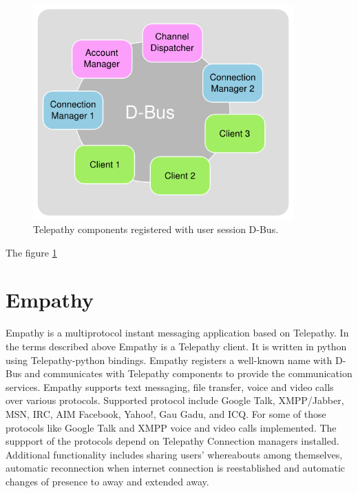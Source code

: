 \begin{figure}[ht]
	\begin{center}
	\includegraphics[width=10cm]{fig/telepathy-components-dbus.png}
	\caption{Telepathy components registered with user session D-Bus.\cite{TPWiki}}
	\label{fig:telepathyComponentsDbus}
\end{center}
\end{figure}

The figure \ref{fig:telepathyComponentsDbus}


\section{Empathy}
Empathy is a multiprotocol instant messaging application based on Telepathy. In the terms described above Empathy is a Telepathy client. It is written in python using Telepathy-python bindings. Empathy registers a well-known name with D-Bus and communicates with Telepathy components to provide the communication services. Empathy supports text messaging, file transfer, voice and video calls over various protocols. Supported protocol include Google Talk, XMPP/Jabber, MSN, IRC, AIM Facebook, Yahoo!, Gau Gadu, and ICQ. For some of those protocols like Google Talk and XMPP voice and video calls implemented. The suppport of the protocols depend on Telepathy Connection managers installed. Additional functionality includes sharing users' whereabouts among themselves, automatic reconnection when internet connection is reestablished and automatic changes of presence to away and extended away.\cite{empathyGnome}

